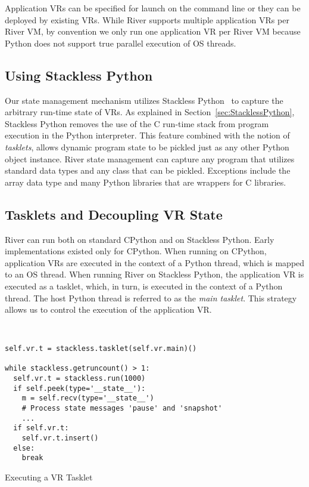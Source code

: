 Application VRs can be specified for launch on the command line or they can be deployed by existing VRs.  While River supports multiple application VRs per River VM, by convention we only run one application VR per River VM because Python does not support true parallel execution of OS threads.

\subsection{Using Stackless Python}

Our state management mechanism utilizes Stackless Python~\cite{Tismer:2000:StacklessPython,Stackless:2007} to capture the arbitrary run-time state of VRs.  As explained in Section~\ref{sec:StacklessPython}, Stackless Python removes the use of the C run-time stack from program execution in the Python interpreter.  This feature combined with the notion of {\it tasklets}, allows dynamic program state to be pickled just as any other Python object instance.  River state management can capture any program that utilizes standard data types and any class that can be pickled.  Exceptions include the array data type and many Python libraries that are wrappers for C libraries.

\subsection{Tasklets and Decoupling VR State}

River can run both on standard CPython and on Stackless Python. Early
implementations existed only for CPython. When running on CPython,
application VRs are executed in the context of a Python thread, which is
mapped to an OS thread. When running River on Stackless Python, the
application VR is executed as a tasklet, which, in turn, is executed in
the context of a Python thread. The host Python thread is referred to as
the {\it main tasklet}. This strategy allows us to control the execution
of the application VR.  


\begin{listing}
\scriptsize
\begin{verbatim}


self.vr.t = stackless.tasklet(self.vr.main)()

while stackless.getruncount() > 1:
  self.vr.t = stackless.run(1000)
  if self.peek(type='__state__'):
    m = self.recv(type='__state__')
    # Process state messages 'pause' and 'snapshot'
    ...
  if self.vr.t:
    self.vr.t.insert()
  else:
    break
\end{verbatim}
\normalsize
\caption{Executing a VR Tasklet}
\label{ex:vrtasklet}
\end{listing}


